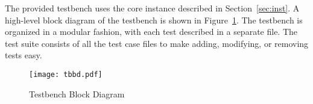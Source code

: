 The provided testbench uses the core instance described in
Section~\ref{sec:inst}. A high-level block diagram of the testbench is shown in
Figure~\ref{fig:tbbd}. The testbench is organized in a modular fashion, with
each test described in a separate file. The test suite consists of all the test
case files to make adding, modifying, or removing tests easy.

\begin{figure}[!htbp]
    \centerline{\texttt{[image: tbbd.pdf]}}
    \vspace{0cm}\caption{Testbench Block Diagram}
    \label{fig:tbbd}
\end{figure}


